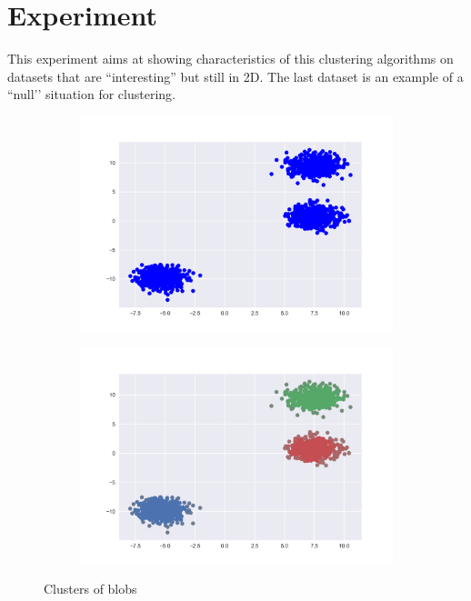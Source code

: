 \documentclass{article}
\begin{document}
\section{Experiment}

This experiment aims at showing characteristics of this clustering algorithms on datasets that are ``interesting'' but still in 2D. The last dataset is an example of a ``null’' situation for clustering.

\begin{figure}[h!]
	\begin{subfigure}{.5\textwidth}
		\centering
		\includegraphics[width=\linewidth]{b_figure_1.png}
		\caption{}
	\end{subfigure}%
	\begin{subfigure}{.5\textwidth}
		\centering
		\includegraphics[width=\linewidth]{b_figure_2.png}
		\caption{}
	\end{subfigure}
	\caption{Clusters of blobs}
\end{figure}
\end{document}
